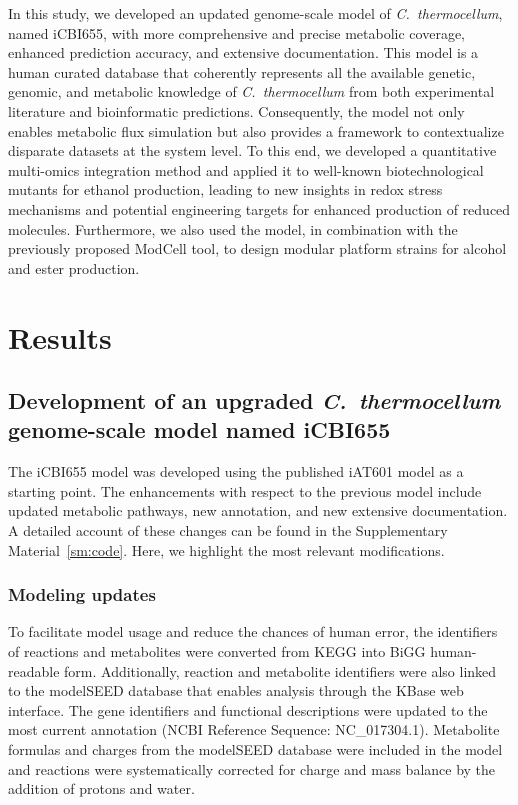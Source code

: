 In this study, we developed an updated genome-scale model of \textit{C.~thermocellum}, named iCBI655, with more comprehensive and precise metabolic coverage, enhanced prediction accuracy, and extensive documentation. This model is a human curated database that coherently represents all the available genetic, genomic, and metabolic knowledge of \textit{C.~thermocellum} from both experimental literature and bioinformatic predictions. Consequently, the model not only enables metabolic flux simulation but also provides a framework to contextualize disparate datasets at the system level. To this end, we developed a quantitative multi-omics integration method and applied it to well-known biotechnological mutants for ethanol production, leading to new insights in redox stress mechanisms and potential engineering targets for enhanced production of reduced molecules. Furthermore, we also used the model,
in combination with the previously proposed ModCell tool, \citep{garcia2019,garcia2020b}
to design modular platform strains\citep{garcia2019b} for alcohol and ester production.

\section{Results}
\subsection{Development of an upgraded \textit{C.~thermocellum} genome-scale model named iCBI655}
The iCBI655 model was developed using the published iAT601 model\citep{thompson2016} as a starting point. The enhancements with respect to the previous model include updated metabolic pathways, new annotation, and new extensive documentation.
A detailed account of these changes can be found in the Supplementary Material~\ref{sm:code}. Here, we highlight the most relevant modifications.

\subsubsection{Modeling updates}
To facilitate model usage and reduce the chances of human error, the identifiers of reactions and metabolites were converted from KEGG into BiGG human-readable form.\citep{king2015}
Additionally, reaction and metabolite identifiers were also linked to the modelSEED database \citep{henry2010} that enables analysis through the KBase web interface. \citep{arkin2018}
The gene identifiers and functional descriptions were updated to the most current annotation (NCBI Reference Sequence: NC\_017304.1). %
Metabolite formulas and charges from the modelSEED database\citep{henry2010} were included in the model and reactions were systematically corrected for charge and mass balance by the addition of protons and water.



